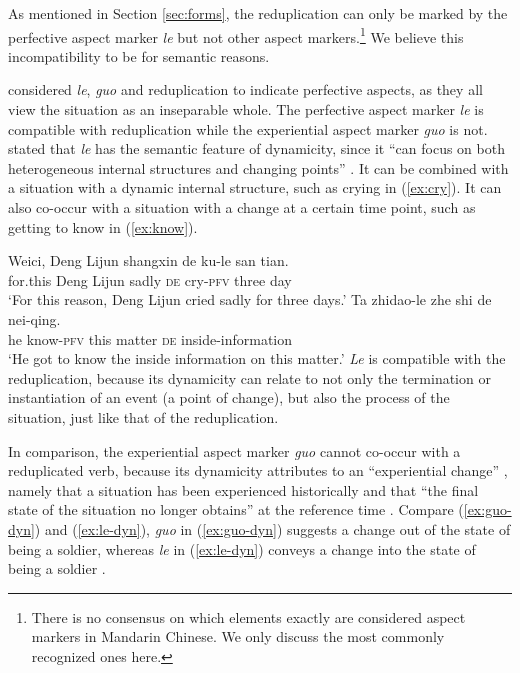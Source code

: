 As mentioned in Section \ref{sec:forms}, the reduplication can only be marked by the perfective aspect marker \textit{le} but not other aspect markers.\footnote{
There is no consensus on which elements exactly are considered aspect markers in Mandarin Chinese. We only discuss the most commonly recognized ones here.
}
We believe this incompatibility to be for semantic reasons.

\citet[Ch. 4]{XiaoMcEnery2004} considered \textit{le}, \textit{guo} and reduplication to indicate perfective aspects, as they all view the situation as an inseparable whole.
The perfective aspect marker \textit{le} is compatible with reduplication while the experiential aspect marker \textit{guo} is not.
\citet[128--131]{XiaoMcEnery2004} stated that \textit{le} has the semantic feature of dynamicity, since it ``can focus on both heterogeneous internal structures and changing points'' \citep[129]{XiaoMcEnery2004}.
It can be combined with a situation with a dynamic internal structure, such as crying in (\ref{ex:cry}).
It can also co\hyp{}occur with a situation with a change at a certain time point, such as getting to know in (\ref{ex:know}).

\settowidth{}

\ea
  \ea\label{ex:cry}
    \gll Weici, Deng Lijun shangxin de ku-le san tian.\\
    for.this Deng Lijun sadly \textsc{de} cry-\textsc{pfv} three day\\ 
    \glt `For this reason, Deng Lijun cried sadly for three days.'
  \ex\label{ex:know}
    \gll Ta zhidao-le zhe shi de nei-qing.\\
    he know-\textsc{pfv} this matter \textsc{de} inside-information\\ 
    \glt `He got to know the inside information on this matter.'
  \z
\z
\textit{Le} is compatible with the reduplication, because its dynamicity can relate to not only the termination or instantiation of an event (a point of change), but also the process of the situation, just like that of the reduplication.

In comparison, the experiential aspect marker \textit{guo} cannot co\hyp{}occur with a reduplicated verb, 
because its dynamicity attributes to an ``experiential change'' \citep[148]{XiaoMcEnery2004}, 
namely that a situation has been experienced historically and that ``the final state of the situation no longer obtains'' at the reference time \citep[144]{XiaoMcEnery2004}. 
Compare (\ref{ex:guo-dyn}) and (\ref{ex:le-dyn}), \textit{guo} in (\ref{ex:guo-dyn}) suggests a change out of the state of being a soldier, 
whereas \textit{le} in (\ref{ex:le-dyn}) conveys a change into the state of being a soldier \citep[149]{XiaoMcEnery2004}.

